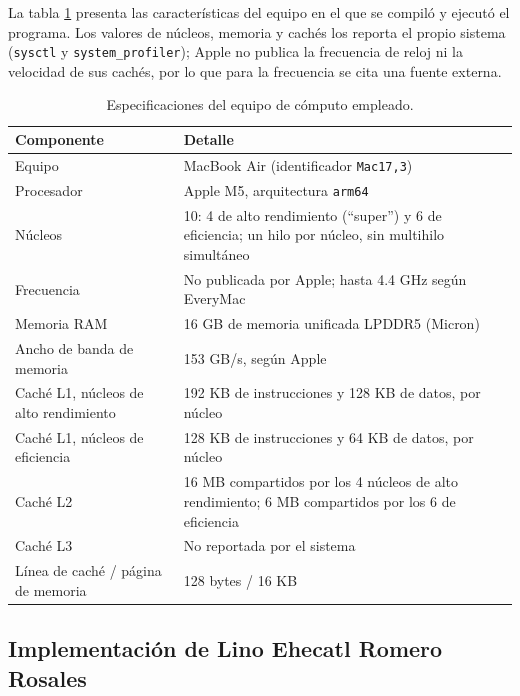 La tabla \ref{tab:cap03:aaron:hardware} presenta las características del equipo en el que se compiló y ejecutó el programa. Los valores de núcleos, memoria y cachés los reporta el propio sistema (\texttt{sysctl} y \texttt{system\_profiler}); Apple no publica la frecuencia de reloj ni la velocidad de sus cachés, por lo que para la frecuencia se cita una fuente externa.

\begin{table}[H]
    \centering
    \caption{Especificaciones del equipo de cómputo empleado.}
    \label{tab:cap03:aaron:hardware}
    \begin{tabular}{p{}p{}}
        \toprule
        \textbf{Componente} & \textbf{Detalle} \\
        \midrule
        Equipo & MacBook Air (identificador \texttt{Mac17,3}) \\
        Procesador & Apple M5, arquitectura \texttt{arm64} \\
        Núcleos & 10: 4 de alto rendimiento (``super'') y 6 de eficiencia; un hilo por núcleo, sin multihilo simultáneo \\
        Frecuencia & No publicada por Apple; hasta 4.4 GHz según EveryMac \cite{everymac:macbook-air-m5:2026} \\
        Memoria RAM & 16 GB de memoria unificada LPDDR5 (Micron) \\
        Ancho de banda de memoria & 153 GB/s, según Apple \cite{apple:macbook-air-specs:2026} \\
        Caché L1, núcleos de alto rendimiento & 192 KB de instrucciones y 128 KB de datos, por núcleo \\
        Caché L1, núcleos de eficiencia & 128 KB de instrucciones y 64 KB de datos, por núcleo \\
        Caché L2 & 16 MB compartidos por los 4 núcleos de alto rendimiento; 6 MB compartidos por los 6 de eficiencia \\
        Caché L3 & No reportada por el sistema \\
        Línea de caché / página de memoria & 128 bytes / 16 KB \\
        \bottomrule
    \end{tabular}
\end{table}

\subsection{Implementación de Lino Ehecatl Romero Rosales}
\label{sec:cap03:lino:implementacion}


